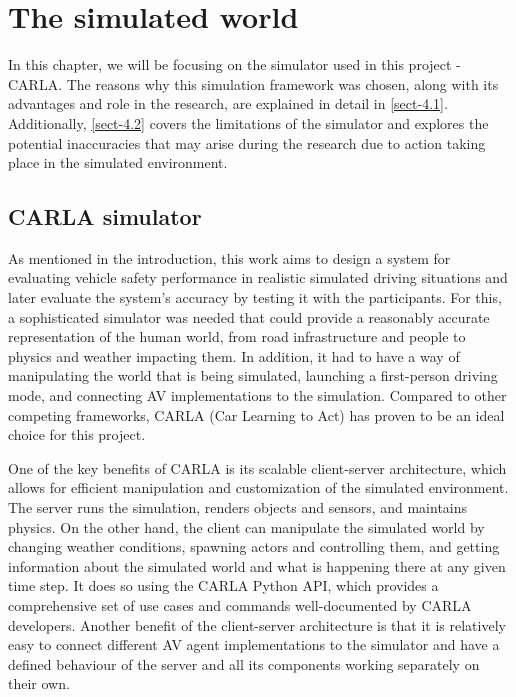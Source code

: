 \chapter{The simulated world} \label{chap:four}

In this chapter, we will be focusing on the simulator used in this project - CARLA. The reasons why this simulation framework was chosen, along with its advantages and role in the research, are explained in detail in \autoref{sect-4.1}. Additionally, \autoref{sect-4.2} covers the limitations of the simulator and explores the potential inaccuracies that may arise during the research due to action taking place in the simulated environment.

\section{CARLA simulator} \label{sect-4.1}
As mentioned in the introduction, this work aims to design a system for evaluating vehicle safety performance in realistic simulated driving situations and later evaluate the system's accuracy by testing it with the participants. For this, a sophisticated simulator was needed that could provide a reasonably accurate representation of the human world, from road infrastructure and people to physics and weather impacting them. In addition, it had to have a way of manipulating the world that is being simulated, launching a first-person driving mode, and connecting AV implementations to the simulation. Compared to other competing frameworks, CARLA (Car Learning to Act) \cite{dosovitskiy2017carla} has proven to be an ideal choice for this project.

One of the key benefits of CARLA is its scalable client-server architecture, which allows for efficient manipulation and customization of the simulated environment. The server runs the simulation, renders objects and sensors, and maintains physics. On the other hand, the client can manipulate the simulated world by changing weather conditions, spawning actors and controlling them, and getting information about the simulated world and what is happening there at any given time step. It does so using the CARLA Python API, which provides a comprehensive set of use cases and commands well-documented by CARLA developers. Another benefit of the client-server architecture is that it is relatively easy to connect different AV agent implementations to the simulator and have a defined behaviour of the server and all its components working separately on their own. 


